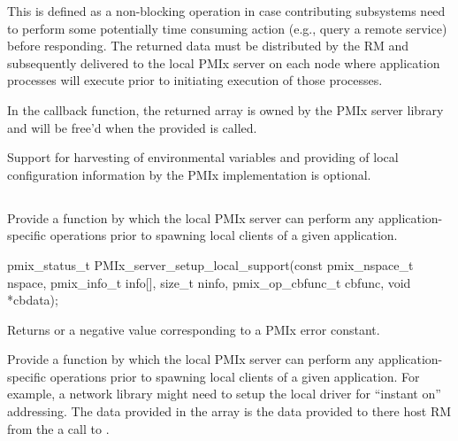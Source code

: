 This is defined as a non-blocking operation in case contributing subsystems need to perform some potentially time consuming action (e.g., query a remote service) before responding. The returned data must be distributed by the \ac{RM} and subsequently delivered to the local \ac{PMIx} server on each node where application processes will execute prior to initiating execution of those processes.

In the callback function, the returned  array is owned by the \ac{PMIx} server library and will be free'd when the provided  is called.

\adviceimplstart
Support for harvesting of environmental variables and providing of local configuration information by the \ac{PMIx} implementation is optional.
\adviceimplend

\subsection{}

\summary

Provide a function by which the local \ac{PMIx} server can perform any application-specific operations prior to spawning local clients of a given application.

\format

\cspecificstart
\begin{codepar}
pmix_status_t
PMIx_server_setup_local_support(const pmix_nspace_t nspace,
                                pmix_info_t info[], size_t ninfo,
                                pmix_op_cbfunc_t cbfunc,
                                void *cbdata);
\end{codepar}
\cspecificend

\begin{arglist}
\end{arglist}

Returns  or a negative value corresponding to a PMIx error constant.


\descr

Provide a function by which the local \ac{PMIx} server can perform any application-specific operations prior to spawning local clients of a given application. For example, a network library might need to setup the local driver for ``instant on'' addressing. The data provided in the  array is the data provided to there host \ac{RM} from the a call to .

